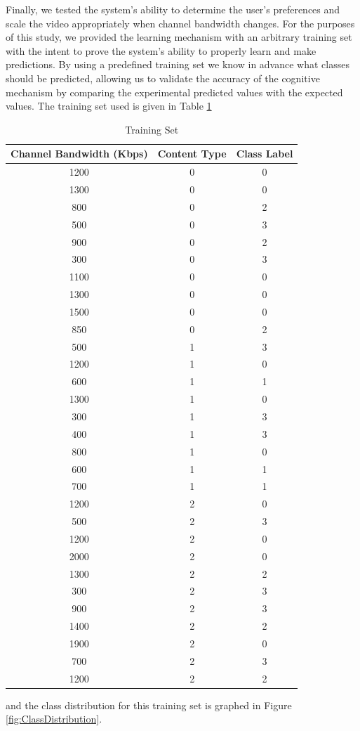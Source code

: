 \documentclass[3p,times,procedia]{elsarticle}
\begin{document}
Finally, we tested the system’s ability to determine the user’s preferences and scale the video appropriately when channel bandwidth changes. For the purposes of this study, we provided the learning mechanism with an arbitrary training set with the intent to prove the system’s ability to properly learn and make predictions. By using a predefined training set we know in advance what classes should be predicted, allowing us to validate the accuracy of the cognitive mechanism by comparing the experimental predicted values with the expected values. The training set used is given in Table \ref{tab:TrainingSet}
\begin{table} [ht]
\centering
\caption{Training Set}
\label{tab:TrainingSet}
\begin{tabular}{c|c|c}
\textbf{Channel Bandwidth (Kbps)}&\textbf{Content Type}&\textbf{Class Label}\\
\hline
1200&0&0\\
1300&0&0\\
800&0&2\\
500&0&3\\
900&0&2\\
300&0&3\\
1100&0&0\\
1300&0&0\\
1500&0&0\\
850&0&2\\
500&1&3\\
1200&1&0\\
600&1&1\\
1300&1&0\\
300&1&3\\
400&1&3\\
800&1&0\\
600&1&1\\
700&1&1\\
1200&2&0\\
500&2&3\\
1200&2&0\\
2000&2&0\\
1300&2&2\\
300&2&3\\
900&2&3\\
1400&2&2\\
1900&2&0\\
700&2&3\\
1200&2&2\\
\end{tabular}
\end{table}
and the class distribution for this training set is graphed in Figure \ref{fig:ClassDistribution}.
\end{document}
